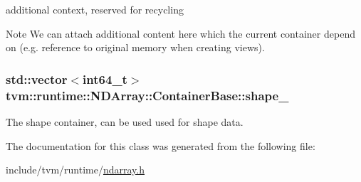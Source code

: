 additional context, reserved for recycling 

\begin{DoxyNote}{Note}
We can attach additional content here which the current container depend on (e.\+g. reference to original memory when creating views). 
\end{DoxyNote}
\subsubsection[{\texorpdfstring{shape\+\_\+}{shape_}}]{\setlength{\rightskip}{0pt plus 5cm}std\+::vector$<$int64\+\_\+t$>$ tvm\+::runtime\+::\+N\+D\+Array\+::\+Container\+Base\+::shape\+\_\+\hspace{0.3cm}{\ttfamily [protected]}}\hypertarget{classtvm_1_1runtime_1_1NDArray_1_1ContainerBase_a852a3d49f916098ea6012237dbd242fc}{}\label{classtvm_1_1runtime_1_1NDArray_1_1ContainerBase_a852a3d49f916098ea6012237dbd242fc}


The shape container, can be used used for shape data. 



The documentation for this class was generated from the following file\+:\begin{DoxyCompactItemize}
\item 
include/tvm/runtime/\hyperlink{ndarray_8h}{ndarray.\+h}\end{DoxyCompactItemize}
